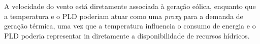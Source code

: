 A velocidade do vento está diretamente associada à geração eólica, enquanto que a temperatura e o PLD poderiam atuar como
uma \textit{proxy} para a demanda de geração térmica, uma vez que a temperatura influencia o consumo de energia e o PLD poderia
representar in diretamente a disponibilidade de recursos hídricos.

\begin{table}[htb]
  \centering
\end{table}